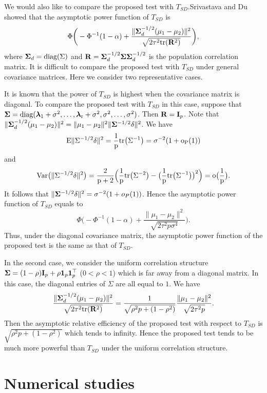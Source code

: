 \documentclass[times,sort&compress,3p]{elsarticle}
\newcommand{\mytr}{\rm tr}
\newcommand{\mydiag}{\rm diag}
\newcommand{\myE}{\rm E}
\newcommand{\myVar}{\rm Var}
\newcommand{\bfsym}[1]{\ensuremath{\boldsymbol{#1}}}
\def\blambda {\bfsym {\lambda}}        \def\bLambda {\bfsym {\Lambda}}
\theoremstyle{plain}
\theoremstyle{definition}
\theoremstyle{remark}
\begin{document}
 We would also like to compare the proposed test with $T_{SD}$.Srivastava and Du~\cite{Srivastava2008A} showed that the asymptotic power function of $T_{SD}$ is
 $$
        \Phi\bigg(-\Phi^{-1}(1-\alpha)+\frac{\|\bSigma_d^{-1/2}(\mu_1-\mu_2)\|^2}{\sqrt{2\tau^2\mytr(\BR^2)}}\bigg),
 $$
 where $\bSigma_d=\mydiag(\bSigma)$ and $\BR=\bSigma_d^{-1/2} \bSigma \bSigma_d^{-1/2}$ is the population correlation matrix.
 It is difficult to compare the proposed test with $T_{SD}$ under general covariance matrices.
 Here we consider two representative cases.


 It is known that the power of $T_{SD}$ is highest when the covariance matrix is diagonal.
 To compare the proposed test with $T_{SD}$ in this case,
suppose that $\bSigma=\mydiag(\blambda_1+\sigma^2,\ldots,\blambda_r+\sigma^2,\sigma^2,\ldots,\sigma^2)$. Then $\mathbf{R}=\mathbf{I}_p$.
 Note that $\|\bSigma_d^{-1/2}(\mu_1-\mu_2)\|^2=\|\mu_1-\mu_2\|^2 \|\bSigma^{-1/2}\delta\|^2$.
 We have 
 $$\myE\|\bSigma^{-1/2}\delta\|^2=
 \frac{1}{p}\mytr\big(\bSigma^{-1}\big)
 =\sigma^{-2} (1+o_P(1))
 $$
and
 $$
 \myVar\big( \|\bSigma^{-1/2}\delta\|^2 \big)=\frac{2}{p+2}\Big(\frac{1}{p}\mytr\big(\bSigma^{-2}\big)-\big(\frac{1}{p}\mytr\big(\bSigma^{-1}\big)\big)^2\Big)=o\big(\frac{1}{p}\big).$$
It follows that $\|\bSigma^{-1/2}\delta\|^2=\sigma^{-2}(1+o_P(1))$. Hence the asymptotic power function of $T_{SD}$ equals to
 $$
        \Phi\bigg(-\Phi^{-1}(1-\alpha)+\frac{\|\mu_1-\mu_2\|^2}{\sqrt{2\tau^2 p\sigma^4}}\bigg).
 $$
 Thus, under the diagonal covariance matrix, the asymptotic power function of the proposed test is the same as that of $T_{SD}$.

In the second case, we consider the uniform correlation structure $\bSigma=(1-\rho)\BI_p+\rho \mathbf{1}_p\mathbf{1}_p^\top $ ($0<\rho <1$) which is far away from a diagonal matrix.
 In this case, the diagonal entries of $\Sigma$ are all equal to $1$. 
 We have
 $$
 \frac{\|\bSigma_d^{-1/2}(\mu_1-\mu_2)\|^2}{\sqrt{2\tau^2\mytr(\BR^2)}}
 =
 \frac{1}{\sqrt{\rho^2 p +(1-\rho^2)}}\frac{\|\mu_1-\mu_2\|^2}{\sqrt{2\tau^2p}}.
 $$
 Then the asymptotic relative efficiency of the proposed test with respect to $T_{SD}$ is
 $\sqrt{\rho^2 p +(1-\rho^2)}$ which tends to infinity.
 Hence the proposed test tends to be much more powerful than $T_{SD}$ under the uniform correlation structure.






\section{Numerical studies}
\end{document}
